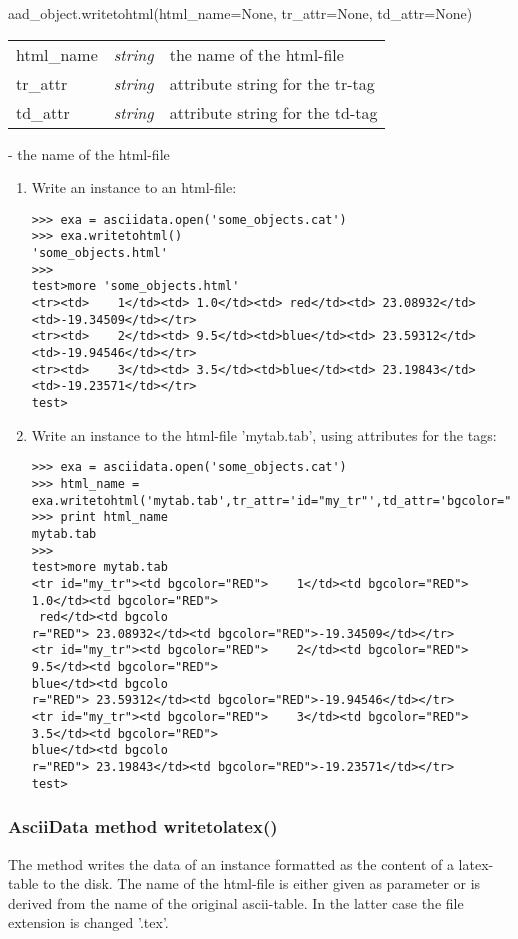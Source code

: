 aad\_object.writetohtml(html\_name=None, tr\_attr=None, td\_attr=None)

\begin{tabular}{lcl}
html\_name & {\it string} & the name of the html-file\\
tr\_attr & {\it string} & attribute string for the tr-tag\\
td\_attr & {\it string} & attribute string for the td-tag\\
\end{tabular}

- the name of the html-file

\begin{enumerate}
\item Write an \ad instance to an html-file:
\begin{small}
\begin{verbatim}
>>> exa = asciidata.open('some_objects.cat')
>>> exa.writetohtml()
'some_objects.html'
>>>
test>more 'some_objects.html'
<tr><td>    1</td><td> 1.0</td><td> red</td><td> 23.08932</td><td>-19.34509</td></tr>
<tr><td>    2</td><td> 9.5</td><td>blue</td><td> 23.59312</td><td>-19.94546</td></tr>
<tr><td>    3</td><td> 3.5</td><td>blue</td><td> 23.19843</td><td>-19.23571</td></tr>
test>
\end{verbatim}
\end{small}
\item Write an \ad instance to the html-file 'mytab.tab', using attributes
for the tags:
\begin{small}
\begin{verbatim}
>>> exa = asciidata.open('some_objects.cat')
>>> html_name = exa.writetohtml('mytab.tab',tr_attr='id="my_tr"',td_attr='bgcolor="RED"')
>>> print html_name
mytab.tab
>>>
test>more mytab.tab
<tr id="my_tr"><td bgcolor="RED">    1</td><td bgcolor="RED"> 1.0</td><td bgcolor="RED">
 red</td><td bgcolo
r="RED"> 23.08932</td><td bgcolor="RED">-19.34509</td></tr>
<tr id="my_tr"><td bgcolor="RED">    2</td><td bgcolor="RED"> 9.5</td><td bgcolor="RED">
blue</td><td bgcolo
r="RED"> 23.59312</td><td bgcolor="RED">-19.94546</td></tr>
<tr id="my_tr"><td bgcolor="RED">    3</td><td bgcolor="RED"> 3.5</td><td bgcolor="RED">
blue</td><td bgcolo
r="RED"> 23.19843</td><td bgcolor="RED">-19.23571</td></tr>
test>
\end{verbatim}
\end{small}
\end{enumerate}


\subsubsection{AsciiData method writetolatex()}
\label{adm_writetolatex}
%
The method writes the data of an \ad instance formatted as the content of
a latex-table to the disk. The name of the html-file is either
given as parameter or is derived from the name of the original ascii-table.
In the latter case the file extension is changed '.tex'.

